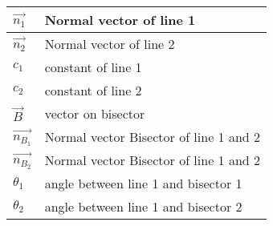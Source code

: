 \begin{table}[H]
    \centering
    \begin{tabular}{|l|l|}
    \hline
      $\vec{n_1}$   & Normal vector of line 1 \\
      \hline
      $\vec{n_2}$   & Normal vector of line 2 \\
      \hline
      $c_1$ & constant of line 1\\
      \hline
      $c_2$ & constant of line 2\\
      \hline
      $\vec{B}$ & vector on bisector\\
      \hline
      $\vec{n_{B_1}}$ & Normal vector Bisector of line 1 and 2\\
      \hline
      $\vec{n_{B_2}}$ & Normal vector Bisector of line 1 and 2\\
      \hline
      $\theta_1$ & angle between line 1 and bisector 1\\
      \hline
      $\theta_2$ & angle between line 1 and bisector 2\\
      \hline
    \end{tabular}
    \caption{}
    \label{tab:tables/table.tex}
\end{table}